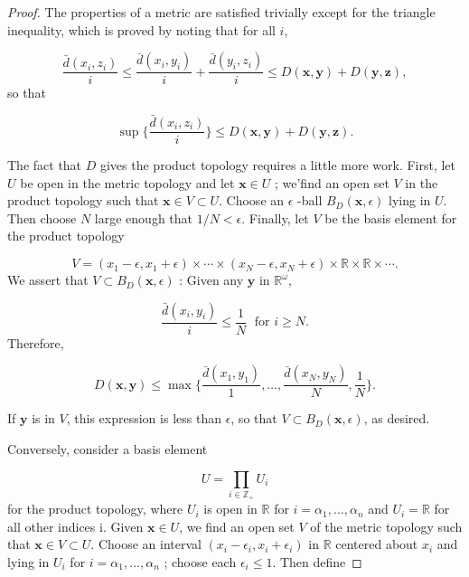 \begin{proof}
 The properties of a metric are satisfied trivially except for the triangle inequality, which is proved by noting that for all \(i\),

 \[
 \frac{\bar{d}( {x_{i},z_{i}}) }{i} \leq \frac{\bar{d}( {x_{i},y_{i}}) }{i} + \frac{\bar{d}( {y_{i},z_{i}}) }{i} \leq D( {\mathbf{x},\mathbf{y}}) + D( {\mathbf{y},\mathbf{z}}),
 \]
 so that

 \[
 \sup \{ \frac{\bar{d}( {x_{i},z_{i}}) }{i}\} \leq D( {\mathbf{x},\mathbf{y}}) + D( {\mathbf{y},\mathbf{z}}).
 \]

 The fact that \(D\) gives the product topology requires a little more work. First, let \(U\) be open in the metric topology and let \(\mathbf{x} \in U\) ; we'find an open set \(V\) in the product topology such that \(\mathbf{x} \in V \subset U\). Choose an \(\epsilon\) -ball \(B_{D}( {\mathbf{x},\epsilon })\) lying in \(U\). Then choose \(N\) large enough that \(1/N < \epsilon\). Finally, let \(V\) be the basis element for the product topology

 \[
 V = ( {x_{1} - \epsilon,x_{1} + \epsilon }) \times \cdots \times ( {x_{N} - \epsilon,x_{N} + \epsilon }) \times \mathbb{R} \times \mathbb{R} \times \cdots .
 \]
 We assert that \(V \subset {B}_{D}( {\mathbf{x},\epsilon })\) : Given any \(\mathbf{y}\) in \(\mathbb{R}^{\omega }\),

 \[
 \frac{\bar{d}( {x_{i},y_{i}}) }{i} \leq \frac{1}{N}\;\text{ for }i \geq N.
 \]
 Therefore,

 \[
 D( {\mathbf{x},\mathbf{y}}) \leq \max \{ {\frac{\bar{d}( {x_{1},y_{1}}) }{1},\ldots,\frac{\bar{d}( {x_{N},y_{N}}) }{N},\frac{1}{N}}\}.
 \]

 If \(\mathbf{y}\) is in \(V\), this expression is less than \(\epsilon\), so that \(V \subset {B}_{D}( {\mathbf{x},\epsilon })\), as desired.

 Conversely, consider a basis element

 \[
 U = \mathop{\prod }\limits_{{i \in {\mathbb{Z}}_{ + }}}U_{i}
 \]
 for the product topology, where \(U_{i}\) is open in \(\mathbb{R}\) for \(i = {\alpha }_{1},\ldots,{\alpha }_{n}\) and \(U_{i} = \mathbb{R}\) for all other indices i. Given \(\mathbf{x} \in U\), we find an open set \(V\) of the metric topology such that \(\mathbf{x} \in V \subset U\). Choose an interval \(( {x_{i} - {\epsilon }_{i},x_{i} + {\epsilon }_{i}})\) in \(\mathbb{R}\) centered about \(x_{i}\) and lying in \(U_{i}\) for \(i = {\alpha }_{1},\ldots,{\alpha }_{n}\) ; choose each \({\epsilon }_{i} \leq 1\). Then define


\end{proof}
